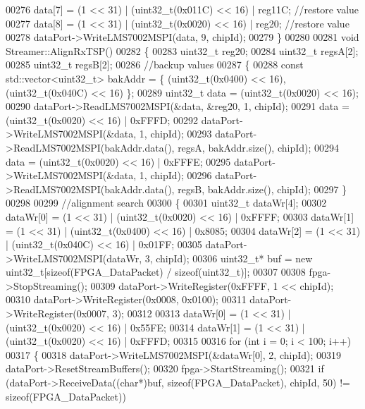 \begin{DoxyCode}
00276     data[7] = (1 << 31) | (uint32\_t(0x011C) << 16) | reg11C;             \textcolor{comment}{//restore value}
00277     data[8] = (1 << 31) | (uint32\_t(0x0020) << 16) | reg20;              \textcolor{comment}{//restore value}
00278     dataPort->WriteLMS7002MSPI(data, 9, chipId);
00279 \}
00280 
00281 \textcolor{keywordtype}{void} Streamer::AlignRxTSP()
00282 \{
00283     uint32\_t reg20;
00284     uint32\_t regsA[2];
00285     uint32\_t regsB[2];
00286     \textcolor{comment}{//backup values}
00287     \{
00288         \textcolor{keyword}{const} std::vector<uint32\_t> bakAddr = \{ (uint32\_t(0x0400) << 16), (uint32\_t(0x040C) << 16) \};
00289         uint32\_t data = (uint32\_t(0x0020) << 16);
00290         dataPort->ReadLMS7002MSPI(&data, &reg20, 1, chipId);
00291         data = (uint32\_t(0x0020) << 16) | 0xFFFD;
00292         dataPort->WriteLMS7002MSPI(&data, 1, chipId);
00293         dataPort->ReadLMS7002MSPI(bakAddr.data(), regsA, bakAddr.size(), chipId);
00294         data = (uint32\_t(0x0020) << 16) | 0xFFFE;
00295         dataPort->WriteLMS7002MSPI(&data, 1, chipId);
00296         dataPort->ReadLMS7002MSPI(bakAddr.data(), regsB, bakAddr.size(), chipId);
00297     \}
00298 
00299     \textcolor{comment}{//alignment search}
00300     \{
00301         uint32\_t dataWr[4];
00302         dataWr[0] = (1 << 31) | (uint32\_t(0x0020) << 16) | 0xFFFF;
00303         dataWr[1] = (1 << 31) | (uint32\_t(0x0400) << 16) | 0x8085;
00304         dataWr[2] = (1 << 31) | (uint32\_t(0x040C) << 16) | 0x01FF;
00305         dataPort->WriteLMS7002MSPI(dataWr, 3, chipId);
00306         uint32\_t* buf = \textcolor{keyword}{new} uint32\_t[\textcolor{keyword}{sizeof}(FPGA_DataPacket) / \textcolor{keyword}{sizeof}(uint32\_t)];
00307 
00308         fpga->StopStreaming();
00309         dataPort->WriteRegister(0xFFFF, 1 << chipId);
00310         dataPort->WriteRegister(0x0008, 0x0100);
00311         dataPort->WriteRegister(0x0007, 3);
00312 
00313         dataWr[0] = (1 << 31) | (uint32\_t(0x0020) << 16) | 0x55FE;
00314         dataWr[1] = (1 << 31) | (uint32\_t(0x0020) << 16) | 0xFFFD;
00315 
00316         \textcolor{keywordflow}{for} (\textcolor{keywordtype}{int} i = 0; i < 100; i++)
00317         \{
00318             dataPort->WriteLMS7002MSPI(&dataWr[0], 2, chipId);
00319             dataPort->ResetStreamBuffers();
00320             fpga->StartStreaming();
00321             \textcolor{keywordflow}{if} (dataPort->ReceiveData((\textcolor{keywordtype}{char}*)buf, \textcolor{keyword}{sizeof}(FPGA_DataPacket), 
      chipId, 50) != \textcolor{keyword}{sizeof}(FPGA_DataPacket))

\end{DoxyCode}
